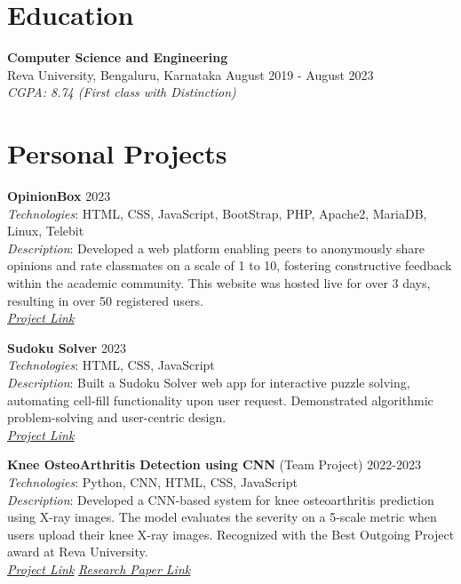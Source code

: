 \documentclass[a4paper,15pt]{article}
\begin{document}
\section*{Education}
\textbf{Computer Science and Engineering} \\
Reva University, Bengaluru, Karnataka \hfill August 2019 - August 2023 \\
\textit{CGPA: 8.74 (First class with Distinction)}

\section*{Personal Projects}

\textbf{OpinionBox} \hfill 2023 \\
\textit{Technologies}: HTML, CSS, JavaScript, BootStrap, PHP, Apache2, MariaDB, Linux, Telebit \\
\textit{Description}: Developed a web platform enabling peers to anonymously share opinions and rate classmates on a scale of 1 to 10, fostering constructive feedback within the academic community. This website was hosted live for over 3 days, resulting in over 50 registered users. \\
\textit{\href{https://github.com/yashasc2k1/OpinionBox}{\underline{Project Link}}}

\textbf{Sudoku Solver} \hfill 2023 \\
\textit{Technologies}: HTML, CSS, JavaScript \\
\textit{Description}: Built a Sudoku Solver web app for interactive puzzle solving, automating cell-fill functionality upon user request. Demonstrated algorithmic problem-solving and user-centric design. \\
\textit{\href{https://yashasc2k1.github.io/SudokuSolver}{\underline{Project Link}}}

\textbf{Knee OsteoArthritis Detection using CNN} (Team Project) \hfill 2022-2023 \\
\textit{Technologies}: Python, CNN, HTML, CSS, JavaScript \\
\textit{Description}: Developed a CNN-based system for knee osteoarthritis prediction using X-ray images. The model evaluates the severity on a 5-scale metric when users upload their knee X-ray images. Recognized with the Best Outgoing Project award at Reva University. \\
\textit{\href{https://github.com/yashasc2k1/KneeOsteoArthritis}{\underline{Project Link}}} \textit{\href{https://www.ijraset.com/research-paper/knee-osteoarthritis-detection-and-severity-prediction}{\underline{Research Paper Link}}}
\end{document}
